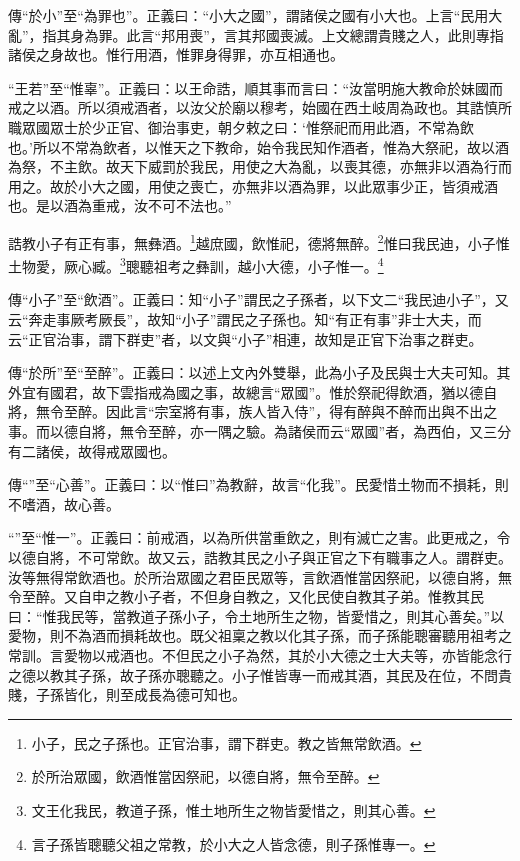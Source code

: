 {\noindent\zhuan{}\fzbyks 傳“於小”至“為罪也”。正義曰：“小大之國”，謂諸侯之國有小大也。上言“民用大亂”，指其身為罪。此言“邦用喪”，言其邦國喪滅。上文總謂貴賤之人，此則專指諸侯之身故也。惟行用酒，惟罪身得罪，亦互相通也。 \par}

{\noindent\shu{}\fzkt “王若”至“惟辜”。正義曰：以王命誥，順其事而言曰：“汝當明施大教命於妹國而戒之以酒。所以須戒酒者，以汝父於廟以穆考，始國在西土岐周為政也。其誥慎所職眾國眾士於少正官、御治事吏，朝夕敕之曰：‘惟祭祀而用此酒，不常為飲也。’所以不常為飲者，以惟天之下教命，始令我民知作酒者，惟為大祭祀，故以酒為祭，不主飲。故天下威罰於我民，用使之大為亂，以喪其德，亦無非以酒為行而用之。故於小大之國，用使之喪亡，亦無非以酒為罪，以此眾事少正，皆須戒酒也。是以酒為重戒，汝不可不法也。” \par}

誥教小子有正有事，無彝酒。\footnote{小子，民之子孫也。正官治事，謂下群吏。教之皆無常飲酒。}越庶國，飲惟祀，德將無醉。\footnote{於所治眾國，飲酒惟當因祭祀，以德自將，無令至醉。}惟曰我民迪，小子惟土物愛，厥心臧。\footnote{文王化我民，教道子孫，惟土地所生之物皆愛惜之，則其心善。}聰聽祖考之彝訓，越小大德，小子惟一。\footnote{言子孫皆聰聽父祖之常教，於小大之人皆念德，則子孫惟專一。}


{\noindent\zhuan{}\fzbyks 傳“小子”至“飲酒”。正義曰：知“小子”謂民之子孫者，以下文二“我民迪小子”，又云“奔走事厥考厥長”，故知“小子”謂民之子孫也。知“有正有事”非士大夫，而云“正官治事，謂下群吏”者，以文與“小子”相連，故知是正官下治事之群吏。 \par}

{\noindent\zhuan{}\fzbyks 傳“於所”至“至醉”。正義曰：以述上文內外雙舉，此為小子及民與士大夫可知。其外宜有國君，故下雲指戒為國之事，故總言“眾國”。惟於祭祀得飲酒，猶以德自將，無令至醉。因此言“宗室將有事，族人皆入侍”，得有醉與不醉而出與不出之事。而以德自將，無令至醉，亦一隅之驗。為諸侯而云“眾國”者，為西伯，又三分有二諸侯，故得戒眾國也。 \par}

{\noindent\zhuan{}\fzbyks 傳“”至“心善”。正義曰：以“惟曰”為教辭，故言“化我”。民愛惜土物而不損耗，則不嗜酒，故心善。 \par}

{\noindent\shu{}\fzkt “”至“惟一”。正義曰：前戒酒，以為所供當重飲之，則有滅亡之害。此更戒之，令以德自將，不可常飲。故又云，誥教其民之小子與正官之下有職事之人。謂群吏。汝等無得常飲酒也。於所治眾國之君臣民眾等，言飲酒惟當因祭祀，以德自將，無令至醉。又自申之教小子者，不但身自教之，又化民使自教其子弟。惟教其民曰：“惟我民等，當教道子孫小子，令土地所生之物，皆愛惜之，則其心善矣。”以愛物，則不為酒而損耗故也。既父祖稟之教以化其子孫，而子孫能聰審聽用祖考之常訓。言愛物以戒酒也。不但民之小子為然，其於小大德之士大夫等，亦皆能念行之德以教其子孫，故子孫亦聰聽之。小子惟皆專一而戒其酒，其民及在位，不問貴賤，子孫皆化，則至成長為德可知也。 \par}

